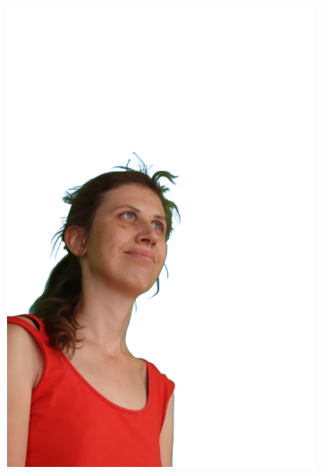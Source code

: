 \begin{figure}[!ht]
\begin{subfigure}{0.12\linewidth}
        \includegraphics[width=\textwidth]{Figures/results/initials/dora/14_render.png}

\end{subfigure}
\end{figure}
